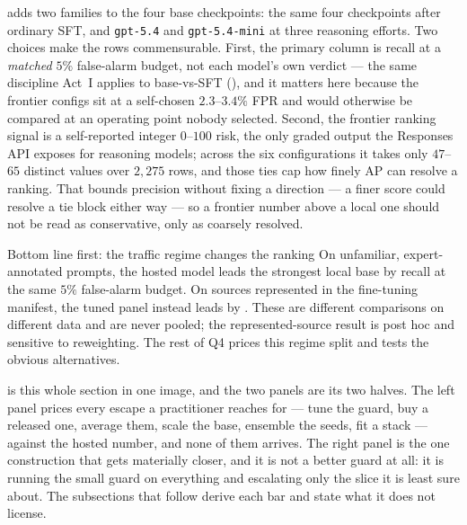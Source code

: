 \documentclass[11pt]{article}
\newcommand{\code}[1]{\texttt{\small #1}}
\begin{document}
 adds two families to the four base checkpoints: the same four checkpoints
after ordinary SFT, and \code{gpt-5.4} and \code{gpt-5.4-mini} at three reasoning efforts. Two
choices make the rows commensurable. First, the primary column is recall at a \emph{matched}
$5\%$ false-alarm budget, not each model's own verdict --- the same discipline Act~I applies to
base-vs-SFT (), and it matters here because the frontier configs sit at a
self-chosen $2.3$--$3.4\%$ FPR and would otherwise be compared at an operating point nobody
selected. Second, the frontier ranking signal is a self-reported integer $0$--$100$ risk, the only
graded output the Responses API exposes for reasoning models; across the six configurations it takes
only $47$--$65$ distinct values over $2{,}275$ rows, and those ties cap how finely AP can resolve a
ranking. That bounds
precision without fixing a direction --- a finer score could resolve a tie block either way --- so a
frontier number above a local one should not be read as conservative, only as coarsely resolved.

\begin{takeaway}{Bottom line first: the traffic regime changes the ranking}
On unfamiliar, expert-annotated prompts, the hosted model leads the strongest local base by
\FrontierGainOverBase{} \FrontierGainOverBaseCI{} recall at the same $5\%$ false-alarm budget. On
sources represented in the fine-tuning manifest, the tuned panel instead leads by
\HtwoAggDeltaTpr{} \HtwoAggDeltaTprCI. These are different comparisons on different data and are never
pooled; the represented-source result is post hoc and sensitive to reweighting. The rest of Q4 prices
this regime split and tests the obvious alternatives.
\end{takeaway}

 is this whole section in one image, and the two panels are its two halves. The
left panel prices every escape a practitioner reaches for --- tune the guard, buy a released one,
average them, scale the base, ensemble the seeds, fit a stack --- against the hosted number, and none
of them arrives. The right panel is the one construction that gets materially closer, and it is not a
better guard at all: it is running the small guard on everything and escalating only the slice it is
least sure about. The subsections that follow derive each bar and state what it does not license.
\end{document}

